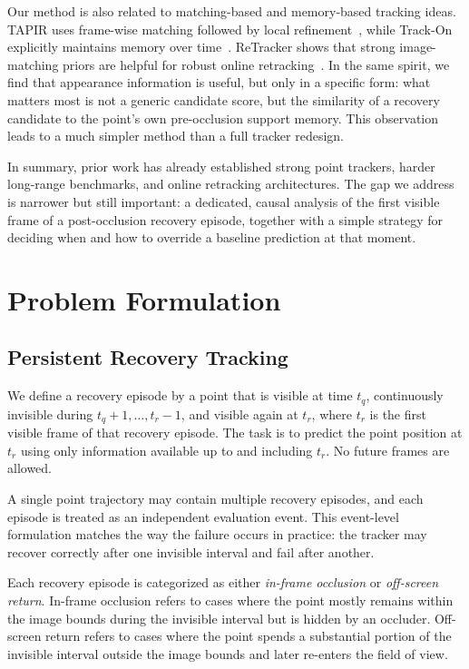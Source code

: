 \documentclass[10pt,journal,compsoc]{IEEEtran}
\begin{document}
Our method is also related to matching-based and memory-based tracking ideas. TAPIR uses frame-wise matching followed by local refinement~\cite{doersch2023tapir}, while Track-On explicitly maintains memory over time~\cite{trackon2025}. ReTracker shows that strong image-matching priors are helpful for robust online retracking~\cite{tan2025retracker}. In the same spirit, we find that appearance information is useful, but only in a specific form: what matters most is not a generic candidate score, but the similarity of a recovery candidate to the point's own pre-occlusion support memory. This observation leads to a much simpler method than a full tracker redesign.

In summary, prior work has already established strong point trackers, harder long-range benchmarks, and online retracking architectures. The gap we address is narrower but still important: a dedicated, causal analysis of the first visible frame of a post-occlusion recovery episode, together with a simple strategy for deciding when and how to override a baseline prediction at that moment.

\section{Problem Formulation}
\label{sec:problem}

\subsection{Persistent Recovery Tracking}

We define a recovery episode by a point that is visible at time $t_q$, continuously invisible during $t_q + 1, \ldots, t_r - 1$, and visible again at $t_r$, where $t_r$ is the first visible frame of that recovery episode. The task is to predict the point position at $t_r$ using only information available up to and including $t_r$. No future frames are allowed.

A single point trajectory may contain multiple recovery episodes, and each episode is treated as an independent evaluation event. This event-level formulation matches the way the failure occurs in practice: the tracker may recover correctly after one invisible interval and fail after another.

Each recovery episode is categorized as either \emph{in-frame occlusion} or \emph{off-screen return}. In-frame occlusion refers to cases where the point mostly remains within the image bounds during the invisible interval but is hidden by an occluder. Off-screen return refers to cases where the point spends a substantial portion of the invisible interval outside the image bounds and later re-enters the field of view.
\end{document}
